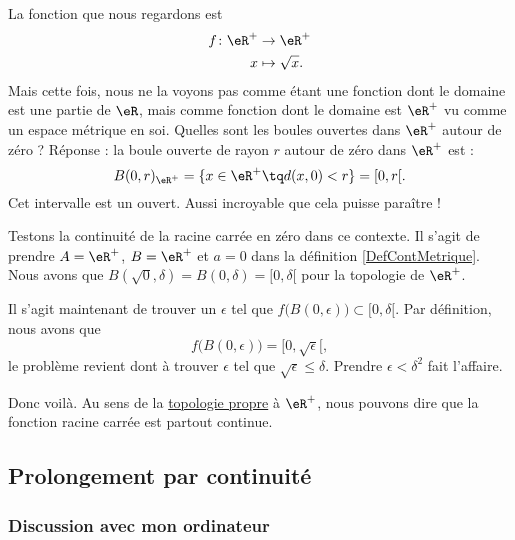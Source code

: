 La fonction que nous regardons est 
\begin{equation}
\begin{aligned}
f \colon \eR^+&\to \eR^+ \\ 
   x&\mapsto \sqrt{x}.
\end{aligned}
\end{equation}
Mais cette fois, nous ne la voyons pas comme étant une fonction dont le domaine est une partie de $\eR$, mais comme fonction dont le domaine est $\eR^+$ vu comme un espace métrique en soi. Quelles sont les boules ouvertes dans $\eR^+$ autour de zéro ? Réponse : la boule ouverte de rayon $r$ autour de zéro dans $\eR^+$ est :
\[ 
  B(0,r)_{\eR^+}=\{ x\in\eR^+\tq d(x,0)<r \}=[0,r[.  
\]
Cet intervalle est un ouvert. Aussi incroyable que cela puisse paraître !

Testons la continuité de la racine carrée en zéro dans ce contexte. Il s'agit de prendre $A=\eR^+$, $B=\eR^+$ et $a=0$ dans la définition \ref{DefContMetrique}. Nous avons que $B(\sqrt{0},\delta)=B(0,\delta)=[0,\delta[$ pour la topologie de $\eR^+$.

Il s'agit maintenant de trouver un $\epsilon$ tel que $f\big( B(0,\epsilon) \big)\subset [0,\delta[$. Par définition, nous avons que
\[ 
  f\big( B(0,\epsilon) \big)=[0,\sqrt{\epsilon}[,
\]
le problème revient dont à trouver $\epsilon$ tel que $\sqrt{\epsilon}\leq\delta$. Prendre $\epsilon<\delta^2$ fait l'affaire.


Donc voilà. Au sens de la \href{http://fr.wikipedia.org/wiki/Topologie_induite}{topologie propre} à $\eR^+$, nous pouvons dire que la fonction racine carrée est partout continue.

\subsection{Prolongement par continuité}

\subsubsection{Discussion avec mon ordinateur}

